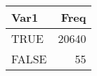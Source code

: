 \begin{table}[H]
\centering
\begin{tabular}[t]{lr}
\toprule
Var1 & Freq\\
\midrule
TRUE & 20640\\
FALSE & 55\\
\bottomrule
\end{tabular}
\end{table}